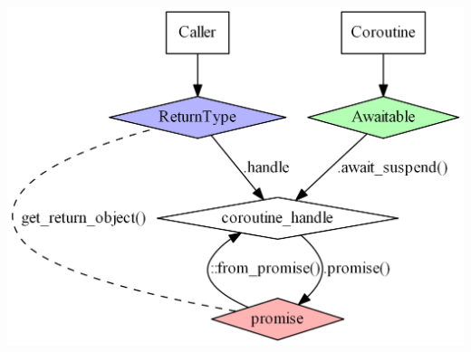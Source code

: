 \documentclass[aspectratio=169]{beamer}
\begin{document}
\begin{frame}
\vspace{20pt}

\begin{center}
  \includegraphics[height=.6\textheight]{corogfx/acquaintances03.png}
\end{center}

\end{frame}
\end{document}
